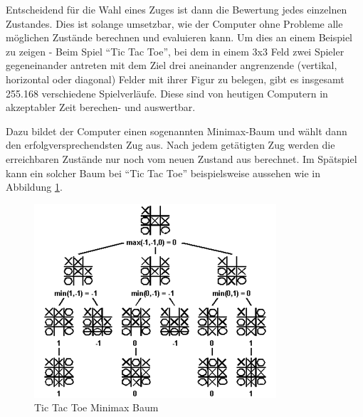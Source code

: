 Entscheidend für die Wahl eines Zuges ist dann die Bewertung jedes einzelnen Zustandes. Dies ist solange umsetzbar, wie der Computer ohne Probleme alle möglichen Zustände berechnen und evaluieren kann. Um dies an einem Beispiel zu zeigen - Beim Spiel ``Tic Tac Toe'', bei dem in einem 3x3 Feld zwei Spieler gegeneinander antreten mit dem Ziel drei aneinander angrenzende (vertikal, horizontal oder diagonal) Felder mit ihrer Figur zu belegen, gibt es insgesamt 255.168 verschiedene Spielverläufe. \cite{Kaplan2017} Diese sind von heutigen Computern in akzeptabler Zeit berechen- und auswertbar.


Dazu bildet der Computer einen sogenannten Minimax-Baum und wählt dann den erfolgversprechendsten Zug aus. Nach jedem getätigten Zug werden die erreichbaren Zustände nur noch vom neuen Zustand aus berechnet. Im Spätspiel kann ein solcher Baum bei ``Tic Tac Toe'' beispielsweise aussehen wie in Abbildung \ref{fig:tictactoe_minimax_tree}.

\begin{figure}[h]
\centering
\includegraphics[width=\textwidth/5*3]{images/tictactoe_minimax_tree.png}

\caption{Tic Tac Toe Minimax Baum \cite{Kurenkov2019}}\label{fig:tictactoe_minimax_tree}
\end{figure}

